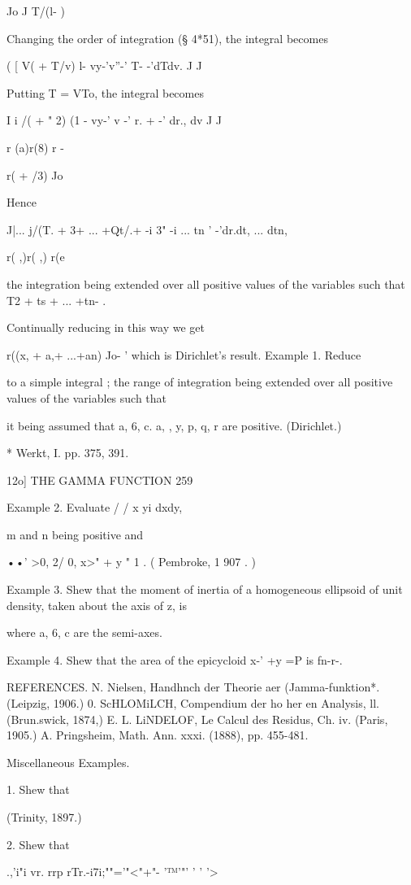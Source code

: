 Jo J T/(l- )

Changing the order of integration (§ 4*51), the integral becomes

( [ V( + T/v) l- vy-'v''-' T- -'dTdv. J J

Putting T = VTo, the integral becomes

I i /( + " 2) (1 - vy-' v -' r. + -' dr., dv J J

r (a)r(8) r -

r( + /3) Jo

Hence

  J|... j/(T. + 3+ ... +Qt/.+ -i 3" -i ... tn ' -'dr.dt, ... dtn,

r( ,)r( ,) r(e

the integration being extended over all positive values of the
variables such that T2 + ts + ... +tn- .

Continually reducing in this way we get

r((x, + a,+ ...+an) Jo- ' which is Dirichlet's result. Example 1.
Reduce

to a simple integral ; the range of integration being extended over
all positive values of the variables such that

it being assumed that a, 6, c. a, , y, p, q, r are positive.
(Dirichlet.)

* Werkt, I. pp. 375, 391.

12o] THE GAMMA FUNCTION 259

Example 2. Evaluate / / x yi dxdy,

m and n being positive and

••' >0, 2/ 0, x>" + y " 1 . ( Pembroke, 1 907 . )

Example 3. Shew that the moment of inertia of a homogeneous ellipsoid
of unit density, taken about the axis of z, is

where a, 6, c are the semi-axes.

Example 4. Shew that the area of the epicycloid x-' +y =P is fn-r-.

REFERENCES. N. Nielsen, Handhnch der Theorie aer (Jamma-funktion*.
(Leipzig, 1906.) 0. ScHLOMiLCH, Compendium der ho her en Analysis, ll.
(Brun.swick, 1874,) E. L. LiNDELOF, Le Calcul des Residus, Ch. iv.
(Paris, 1905.) A. Pringsheim, Math. Ann. xxxi. (1888), pp. 455-481.

Miscellaneous Examples.

1. Shew that

(Trinity, 1897.)

2. Shew that

.,'i"i vr. rrp rTr.-i7i;""='"<"+"- '™'"' ' ' '>

